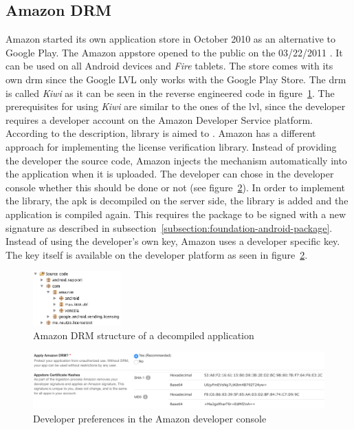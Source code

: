 \subsection{Amazon DRM} \label{section:license-amazon}
Amazon started its own application store in October 2010 \cite{amazonBeta} as an alternative to Google Play.
The Amazon appstore opened to the public on the 03/22/2011 \cite{amazonRelease}.
It can be used on all Android devices and \textit{Fire} tablets.
The store comes with its own \gls{drm} since the Google LVL only works with the Google Play Store.
The \gls{drm} is called \textit{Kiwi} as it can be seen in the reverse engineered code in figure~\ref{fig:amazonFolder}.
\newline
The prerequisites for using \textit{Kiwi} are similar to the ones of the \gls{lvl}, since the developer requires a developer account on the Amazon Developer Service platform.
According to the description, library is aimed to \grqq \cite{amazonDeveloper}.
\newline
Amazon has a different approach for implementing the license verification library.
Instead of providing the developer the source code, Amazon injects the mechanism automatically into the application when it is uploaded.
The developer can chose in the developer console whether this should be done or not (see figure~\ref{fig:amazon}).
In order to implement the library, the \gls{apk} is decompiled on the server side, the library is added and the application is compiled again.
This requires the package to be signed with a new signature as described in subsection~\ref{subsection:foundation-android-package}.
Instead of using the developer's own key, Amazon uses a developer specific key.
The key itself is available on the developer platform as seen in figure~\ref{fig:amazon}. \cite{amazonDeveloper}
\newline
\begin{figure}[h]
    \centering
    \includegraphics[width=0.3\textwidth]{data/amazonFolder.png}
    \caption{Amazon DRM structure of a decompiled application}
    \label{fig:amazonFolder}
\end{figure}
\begin{figure}[h]
    \centering
    \includegraphics[width=1\textwidth]{data/amazon.png}
    \caption{Developer preferences in the Amazon developer console \cite{amazonDeveloper}}
    \label{fig:amazon}
\end{figure}
